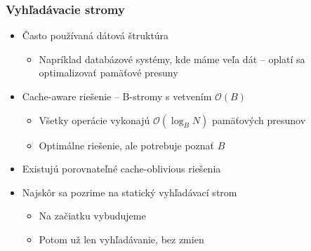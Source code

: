 \documentclass{beamer}
\newcommand{\bigO}{\ensuremath{\mathcal{O}}}
\begin{document}
\begin{frame}
    \frametitle{Vyhľadávacie stromy}
    \begin{itemize}
        \item Často používaná dátová štruktúra
        \begin{itemize}
            \item Napríklad databázové systémy, kde máme veľa dát -- oplatí sa optimalizovať pamäťové presuny
        \end{itemize}
        \item Cache-aware riešenie -- B-stromy s vetvením $\bigO(B)$
        \begin{itemize}
            \item Všetky operácie vykonajú $\bigO(\log_B N)$ pamäťových presunov
            \item Optimálne riešenie, ale potrebuje poznať $B$
        \end{itemize}
        \item Existujú porovnateľné cache-oblivious riešenia
        \item Najskôr sa pozrime na statický vyhľadávací strom
        \begin{itemize}
            \item Na začiatku vybudujeme
            \item Potom už len vyhľadávanie, bez zmien
        \end{itemize}
    \end{itemize}
\end{frame}
\end{document}
